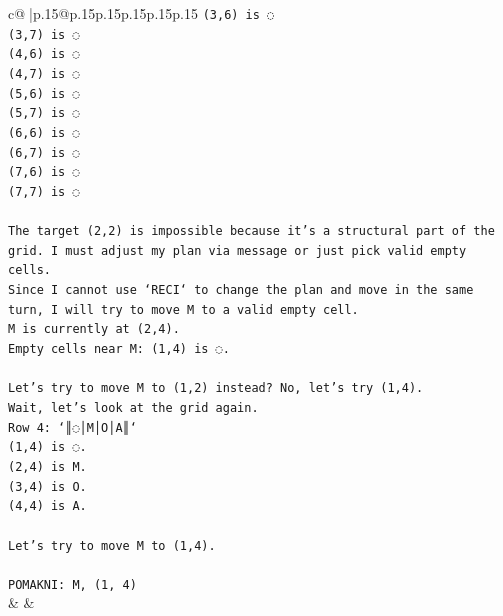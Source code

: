 \documentclass{article}
\begin{document}
{\begin{supertabular}{c@{$\;$}|p{.15\linewidth}@{}p{.15\linewidth}p{.15\linewidth}p{.15\linewidth}p{.15\linewidth}p{.15\linewidth}}
{{{\texttt{(3,6) is ◌} \\
\texttt{(3,7) is ◌} \\
\texttt{(4,6) is ◌} \\
\texttt{(4,7) is ◌} \\
\texttt{(5,6) is ◌} \\
\texttt{(5,7) is ◌} \\
\texttt{(6,6) is ◌} \\
\texttt{(6,7) is ◌} \\
\texttt{(7,6) is ◌} \\
\texttt{(7,7) is ◌} \\
\\ 
\texttt{The target (2,2) is impossible because it's a structural part of the grid. I must adjust my plan via message or just pick valid empty cells.} \\
\texttt{Since I cannot use `RECI` to change the plan and move in the same turn, I will try to move M to a valid empty cell.} \\
\texttt{M is currently at (2,4).} \\
\texttt{Empty cells near M: (1,4) is ◌.} \\
\\ 
\texttt{Let's try to move M to (1,2) instead? No, let's try (1,4).} \\
\texttt{Wait, let's look at the grid again.} \\
\texttt{Row 4: `║◌│M│O│A║`} \\
\texttt{(1,4) is ◌.} \\
\texttt{(2,4) is M.} \\
\texttt{(3,4) is O.} \\
\texttt{(4,4) is A.} \\
\\ 
\texttt{Let's try to move M to (1,4).} \\
\\ 
\texttt{POMAKNI: M, (1, 4)} \\
            }
        }
    }
    & & \\ \\


\end{supertabular}}
\end{document}
